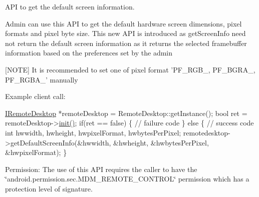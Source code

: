 \-A\-P\-I to get the default screen information. 

\-Admin can use this \-A\-P\-I to get the default hardware screen dimensions, pixel formats and pixel byte size. \-This new \-A\-P\-I is introduced as get\-Screen\-Info need not return the default screen information as it returns the selected framebuffer information based on the preferences set by the admin\par
 \mbox{[}\-N\-O\-T\-E\mbox{]} \-It is recommended to set one of pixel format '\-P\-F\-\_\-\-R\-G\-B\-\_, \-P\-F\-\_\-\-B\-G\-R\-A\-\_, \-P\-F\-\_\-\-R\-G\-B\-A\-\_' manually

\-Example client call\-:


\begin{DoxyPre}
  \hyperlink{classandroid_1_1IRemoteDesktop}{IRemoteDesktop} *remoteDesktop = RemoteDesktop::getInstance();
  bool ret = remoteDesktop->\hyperlink{classandroid_1_1IRemoteDesktop_a5792cf8c7fa9eeb8e21f39927d0fed1e}{init()};
  if(ret == false)  \{
     // failure code
  \} else \{
     // success code	 
     int	hwwidth, hwheight, hwpixelFormat, hwbytesPerPixel;	
     remotedesktop->getDefaultScreenInfo(&hwwidth, &hwheight, &hwbytesPerPixel, &hwpixelFormat);
  \}
 \end{DoxyPre}


\begin{DoxyParagraph}{\-Permission\-: }
\-The use of this \-A\-P\-I requires the caller to have the \char`\"{}android.\-permission.\-sec.\-M\-D\-M\-\_\-\-R\-E\-M\-O\-T\-E\-\_\-\-C\-O\-N\-T\-R\-O\-L\char`\"{} permission which has a protection level of signature.
\end{DoxyParagraph}


